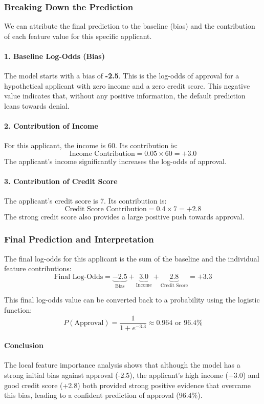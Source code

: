 \documentclass{article}
\begin{document}
\begin{multicols}{2}
\subsubsection{Breaking Down the Prediction}

We can attribute the final prediction to the baseline (bias) and the contribution of each feature value for this specific applicant.

\paragraph{1. Baseline Log-Odds (Bias)} The model starts with a bias of \textbf{-2.5}. This is the log-odds of approval for a hypothetical applicant with zero income and a zero credit score. This negative value indicates that, without any positive information, the default prediction leans towards denial.

\paragraph{2. Contribution of Income} For this applicant, the income is 60. Its contribution is:
$$ \text{Income Contribution} = 0.05 \times 60 = +3.0 $$
The applicant's income significantly increases the log-odds of approval.

\paragraph{3. Contribution of Credit Score} The applicant's credit score is 7. Its contribution is:
$$ \text{Credit Score Contribution} = 0.4 \times 7 = +2.8 $$
The strong credit score also provides a large positive push towards approval.

\subsubsection{Final Prediction and Interpretation}

The final log-odds for this applicant is the sum of the baseline and the individual feature contributions:
$$ \text{Final Log-Odds} = \underbrace{-2.5}_{\text{Bias}} + \underbrace{3.0}_{\text{Income}} + \underbrace{2.8}_{\text{Credit Score}} = +3.3 $$

This final log-odds value can be converted back to a probability using the logistic function:
$$ P(\text{Approval}) = \frac{1}{1 + e^{-3.3}} \approx 0.964 \text{ or } 96.4\% $$

\paragraph{Conclusion} The local feature importance analysis shows that although the model has a strong initial bias against approval (-2.5), the applicant's high income (+3.0) and good credit score (+2.8) both provided strong positive evidence that overcame this bias, leading to a confident prediction of approval (96.4\%).



\end{multicols}
\end{document}
